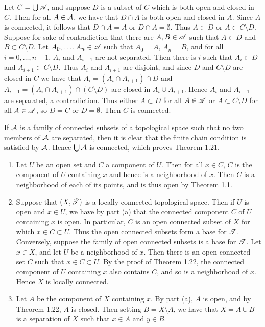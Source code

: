 \begin{prob}
Let $C = \bigcup\mathscr{A}$, and suppose $D$ is a subset of $C$ which is both open and closed in $C$. Then for all $A \in \mathcal{A}$, we have that $D\cap A$ is both open and closed in $A$. Since $A$ is connected, it follows that $D\cap A = A$ or $D\cap A = \emptyset$. Thus $A \subset D$ or $A \subset C\setminus D$. Suppose for sake of contradiction that there are $A, B \in \mathscr{A}$ such that $A \subset D$ and $B \subset C\setminus D$. Let $A_0, \ldots, A_n \in \mathscr{A}$ such that $A_0 = A$, $A_n = B$, and for all $i = 0, \ldots, n-1$, $A_i$ and $A_{i+1}$ are not separated. Then there is $i$ such that $A_i \subset D$ and $A_{i+1} \subset C\setminus D$. Thus $A_i$ and $A_{i+1}$ are disjoint, and since $D$ and $C\setminus D$ are closed in $C$ we have that $A_i = (A_i\cap A_{i+1})\cap D$ and $A_{i+1} = (A_i\cap A_{i+1})\cap (C\setminus D)$ are closed in $A_i\cup A_{i+1}$. Hence $A_i$ and $A_{i+1}$ are separated, a contradiction. Thus either $A \subset D$ for all $A \in \mathscr{A}$ or $A \subset C\setminus D$ for all $A \in \mathscr{A}$, so $D = C$ or $D = \emptyset$. Then $C$ is connected.

If $\mathcal{A}$ is a family of connected subsets of a topological space such that no two members of $\mathcal{A}$ are separated, then it is clear that the finite chain condition is satisfied by $\mathcal{A}$. Hence $\bigcup\mathcal{A}$ is connected, which proves Theorem 1.21.
\end{prob}

\begin{prob}
\begin{enumerate}
\item Let $U$ be an open set and $C$ a component of $U$. Then for all $x \in C$, $C$ is the component of $U$ containing $x$ and hence is a neighborhood of $x$. Then $C$ is a neighborhood of each of its points, and is thus open by Theorem 1.1.

\item Suppose that $(X, \mathscr{T})$ is a locally connected topological space. Then if $U$ is open and $x \in U$, we have by part (a) that the connected component $C$ of $U$ containing $x$ is open. In particular, $C$ is an open connected subset of $X$ for which $x \in C \subset U$. Thus the open connected subsets form a base for $\mathscr{T}$. Conversely, suppose the family of open connected subsets is a base for $\mathscr{T}$. Let $x \in X$, and let $U$ be a neighborhood of $x$. Then there is an open connected set $C$ such that $x \in C \subset U$. By the proof of Theorem 1.22, the connected component of $U$ containing $x$ also contains $C$, and so is a neighborhood of $x$. Hence $X$ is locally connected.

\item Let $A$ be the component of $X$ containing $x$. By part (a), $A$ is open, and by Theorem 1.22, $A$ is closed. Then setting $B = X\setminus A$, we have that $X = A\cup B$ is a separation of $X$ such that $x \in A$ and $y \in B$.
\end{enumerate}
\end{prob}

